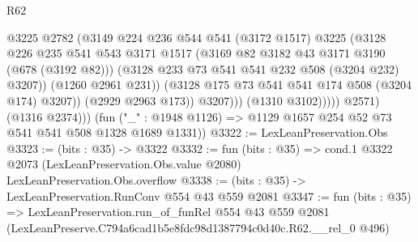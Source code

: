 \begin{lexlean}{R62}
\begin{coremodule}
                              @3225
                              @2782
                              (@3149
                                @224
                                @236
                                @544
                                @541
                                (@3172 @1517)
                                @3225
                                (@3128
                                  @226
                                  @235
                                  @541
                                  @543
                                  @3171
                                  @1517
                                  (@3169 @82 @3182 @43 @3171 @3190 (@678 (@3192 @82)))
                                  (@3128 @233 @73 @541 @541 @232 @508 (@3204 @232) @3207))
                                (@1260 @2961 @231))
                              (@3128 @175 @73 @541 @541 @174 @508 (@3204 @174) @3207))
                            (@2929 @2963 @173))
                          @3207)))
                    (@1310 @3102)))))
            @2571)
          (@1316 @2374)))
      (fun ("_" : @1948 @1126) => @1129 @1657 @254 @52 @73 @541 @541 @508 @1328 @1689 @1331))
@3322 := LexLeanPreservation.Obs
@3323 := (bits : @35) -> @3322
@3332 := fun (bits : @35) =>
  cond.{1} @3322 @2073 (LexLeanPreservation.Obs.value @2080) LexLeanPreservation.Obs.overflow
@3338 := (bits : @35) -> LexLeanPreservation.RunConv @554 @43 @559 @2081
@3347 := fun (bits : @35) =>
  LexLeanPreservation.run_of_funRel
    @554
    @43
    @559
    @2081
    (LexLeanPreserve.C794a6cad1b5e8fdc98d1387794c0d40c.R62.__rel_0 @496)
\end{coremodule}
\end{lexlean}
